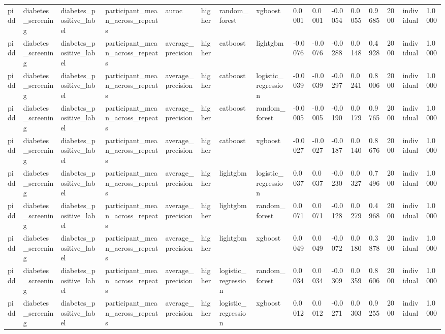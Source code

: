 \begin{tabular}{llllllllllllllll}
pidd & diabetes\_screening & diabetes\_positive\_label & participant\_mean\_across\_repeats & auroc & higher & random\_forest & xgboost & 0.0001 & 0.0001 & -0.0054 & 0.0055 & 0.9685 & 2000 & individual & 1.0000 \\
pidd & diabetes\_screening & diabetes\_positive\_label & participant\_mean\_across\_repeats & average\_precision & higher & catboost & lightgbm & -0.0076 & -0.0076 & -0.0288 & 0.0148 & 0.4928 & 2000 & individual & 1.0000 \\
pidd & diabetes\_screening & diabetes\_positive\_label & participant\_mean\_across\_repeats & average\_precision & higher & catboost & logistic\_regression & -0.0039 & -0.0039 & -0.0297 & 0.0241 & 0.8006 & 2000 & individual & 1.0000 \\
pidd & diabetes\_screening & diabetes\_positive\_label & participant\_mean\_across\_repeats & average\_precision & higher & catboost & random\_forest & -0.0005 & -0.0005 & -0.0190 & 0.0179 & 0.9765 & 2000 & individual & 1.0000 \\
pidd & diabetes\_screening & diabetes\_positive\_label & participant\_mean\_across\_repeats & average\_precision & higher & catboost & xgboost & -0.0027 & -0.0027 & -0.0187 & 0.0140 & 0.8676 & 2000 & individual & 1.0000 \\
pidd & diabetes\_screening & diabetes\_positive\_label & participant\_mean\_across\_repeats & average\_precision & higher & lightgbm & logistic\_regression & 0.0037 & 0.0037 & -0.0230 & 0.0327 & 0.7496 & 2000 & individual & 1.0000 \\
pidd & diabetes\_screening & diabetes\_positive\_label & participant\_mean\_across\_repeats & average\_precision & higher & lightgbm & random\_forest & 0.0071 & 0.0071 & -0.0128 & 0.0279 & 0.4968 & 2000 & individual & 1.0000 \\
pidd & diabetes\_screening & diabetes\_positive\_label & participant\_mean\_across\_repeats & average\_precision & higher & lightgbm & xgboost & 0.0049 & 0.0049 & -0.0072 & 0.0180 & 0.3878 & 2000 & individual & 1.0000 \\
pidd & diabetes\_screening & diabetes\_positive\_label & participant\_mean\_across\_repeats & average\_precision & higher & logistic\_regression & random\_forest & 0.0034 & 0.0034 & -0.0309 & 0.0359 & 0.8606 & 2000 & individual & 1.0000 \\
pidd & diabetes\_screening & diabetes\_positive\_label & participant\_mean\_across\_repeats & average\_precision & higher & logistic\_regression & xgboost & 0.0012 & 0.0012 & -0.0271 & 0.0303 & 0.9255 & 2000 & individual & 1.0000 \\

\end{tabular}
